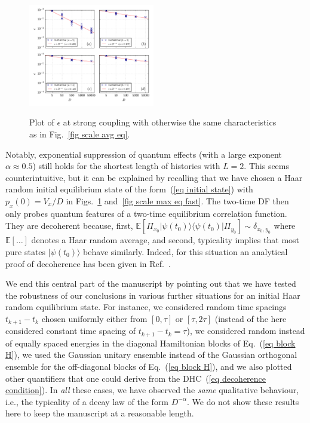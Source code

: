 \documentclass[pre,onecolumn,12pt,aps,longbibliography,nofootinbib]{revtex4-2}
\newcommand{\rl}[0]{{\rangle\langle}}
\newcommand{\new}[1]{#1}
\begin{document}
\begin{figure}[t]
 \centering\includegraphics[width=0.49\textwidth,clip=true]{eps_1_eq.pdf}
 \label{fig scale avg eq fast}\vspace{-0.5cm}
 \caption{Plot of $\epsilon$ at strong coupling with otherwise the same characteristics as in Fig.~\ref{fig scale avg eq}. }
\end{figure}

Notably, exponential suppression of quantum effects (with a large exponent $\alpha\approx0.5$) still
holds for the shortest length of histories with $L=2$. This seems counterintuitive, but it can be explained by
recalling that we have chosen a Haar random initial equilibrium state of the form~(\ref{eq initial state}) with
$p_x(0) = V_x/D$ in Figs.~\ref{fig scale avg eq fast} and~\ref{fig scale max eq fast}.
The two-time DF then only probes quantum features of a two-time equilibrium correlation function. They are \new{decoherent} because, first, $\mathbb{E}[\Pi_{x_0}|\psi(t_0)\rl\psi(t_0)|\Pi_{y_0}] \sim \delta_{x_0,y_0}$ where
$\mathbb{E}[\dots]$ denotes a Haar random average, and second, typicality implies that most pure states
$|\psi(t_0)\rangle$ behave similarly. Indeed, for this situation an analytical proof of \new{decoherence} has been given
in Ref.~\cite{StrasbergEtAlPRA2023}.

We end this central part of the manuscript by pointing out that we have tested the robustness of our conclusions
in various further situations for an initial Haar random equilibrium state. For instance, we considered random time 
spacings $t_{k+1}-t_{k}$ chosen uniformly either from $[0,\tau]$ or $[\tau,2\tau]$ (instead of the here considered 
constant time spacing of $t_{k+1}-t_{k} = \tau$), we considered random instead of equally spaced energies in the 
diagonal Hamiltonian blocks of Eq.~(\ref{eq block H}), we used the Gaussian unitary ensemble instead of the Gaussian 
orthogonal ensemble for the off-diagonal blocks of Eq.~(\ref{eq block H}), and we also plotted other quantifiers that 
one could derive from the DHC~(\ref{eq decoherence condition}). In \emph{all} these cases, we have observed the 
\emph{same} qualitative behaviour, i.e., the typicality of a decay law of the form $D^{-\alpha}$. We do not show these 
results here to keep the manuscript at a reasonable length.
\end{document}
